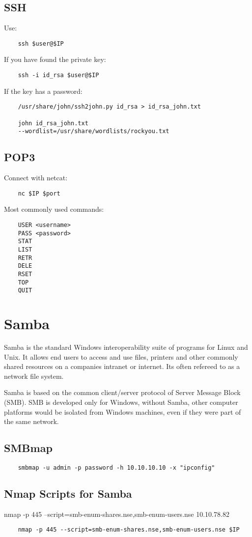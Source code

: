 \documentclass[12pt,a4paper]{scrartcl}
\begin{document}
\subsection{SSH}
Use:
\begin{lstlisting}
	ssh $user@$IP
\end{lstlisting}
If you have found the private key:
\begin{lstlisting}
	ssh -i id_rsa $user@$IP
\end{lstlisting}
If the key has a password:
\begin{lstlisting}
	/usr/share/john/ssh2john.py id_rsa > id_rsa_john.txt
	
	john id_rsa_john.txt
	--wordlist=/usr/share/wordlists/rockyou.txt
\end{lstlisting}

\subsection{POP3}
Connect with netcat:
\begin{lstlisting}
	nc $IP $port
\end{lstlisting}
Most commonly used commands:
\begin{lstlisting}
	USER <username>
	PASS <password>
	STAT
	LIST
	RETR
	DELE
	RSET
	TOP
	QUIT
\end{lstlisting}

\section{Samba}
Samba is the standard Windows interoperability suite of programs for Linux and Unix. It allows end users to access and use files, printers and other commonly shared resources on a companies intranet or internet. Its often refereed to as a network file system.

Samba is based on the common client/server protocol of Server Message Block (SMB). SMB is developed only for Windows, without Samba, other computer platforms would be isolated from Windows machines, even if they were part of the same network.
\subsection{SMBmap}
\begin{lstlisting}
	smbmap -u admin -p password -h 10.10.10.10 -x "ipconfig"
\end{lstlisting}

\subsection{Nmap Scripts for Samba}
nmap -p 445 --script=smb-enum-shares.nse,smb-enum-users.nse 10.10.78.82
\begin{lstlisting}
	nmap -p 445 --script=smb-enum-shares.nse,smb-enum-users.nse $IP
\end{lstlisting}
\end{document}
